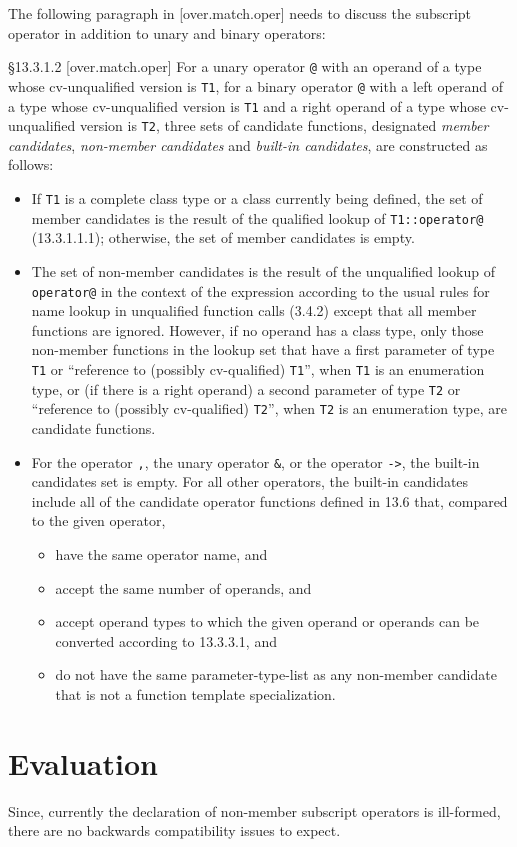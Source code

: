 The following paragraph in [over.match.oper] needs to discuss the subscript operator in addition to unary and binary operators:
\begin{wgText}{§13.3.1.2 [over.match.oper]}
  For a unary operator \texttt{@} with an operand of a type whose cv-unqualified version is \texttt{T1}, for a binary operator \texttt{@} with a left operand of a type whose cv-unqualified version is \texttt{T1} and a right operand of a type whose cv-unqualified version is \texttt{T2}, three sets of candidate functions, designated \emph{member candidates}, \emph{non-member candidates} and \emph{built-in candidates}, are constructed as follows:
  \begin{itemize}
    \item If \texttt{T1} is a complete class type or a class currently being defined, the set of member candidates is the result of the qualified lookup of \texttt{T1::operator@} (13.3.1.1.1); otherwise, the set of member candidates is empty.
    \item The set of non-member candidates is the result of the unqualified lookup of \texttt{operator@} in the context of the expression according to the usual rules for name lookup in unqualified function calls (3.4.2) except that all member functions are ignored.
      However, if no operand has a class type, only those non-member functions in the lookup set that have a first parameter of type \texttt{T1} or “reference to (possibly cv-qualified) \texttt{T1}”, when \texttt{T1} is an enumeration type, or (if there is a right operand) a second parameter of type \texttt{T2} or “reference to (possibly cv-qualified) \texttt{T2}”, when \texttt{T2} is an enumeration type, are candidate functions.
    \item For the operator \texttt{,}, the unary operator \texttt{\&}, or the operator \texttt{->}, the built-in candidates set is empty.
      For all other operators, the built-in candidates include all of the candidate operator functions defined in 13.6 that, compared to the given operator,
      \begin{itemize}
        \item have the same operator name, and
        \item accept the same number of operands, and
        \item accept operand types to which the given operand or operands can be converted according to 13.3.3.1, and
        \item do not have the same parameter-type-list as any non-member candidate that is not a function template specialization.
      \end{itemize}
  \end{itemize}
\end{wgText}

\section{Evaluation}

Since, currently the declaration of non\hyp member subscript operators is ill\hyp formed, there are no backwards compatibility issues to expect.



